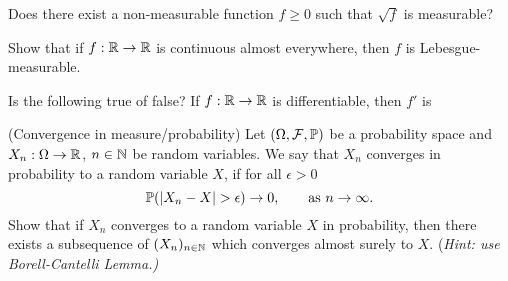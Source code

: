 \begin{problem}
    Does there exist a non-measurable function $f \geq 0$ such that
    $\sqrt{f}$ is measurable?
\end{problem}

\begin{problem}
    Show that if $f:\mathbb R\to \mathbb R$ is continuous almost everywhere, then $f$ is Lebesgue-measurable.
\end{problem}

\begin{problem}
    Is the following true of false?
    If $f : \mathbb R \to \mathbb R$ is differentiable, then $f'$ is 
\end{problem}

\begin{problem}(Convergence in measure/probability) Let $(\Omega,\mathcal F,\mathbb P)$ be a probability space and $X_n:\Omega \to \mathbb R$, $n\in \mathbb N$ be random variables. We say that $X_n$ converges in probability to a random variable $X$, if for all $\epsilon>0$
    \begin{equation*}
        \bbP(|X_n-X|>\epsilon) \to 0,\qquad\text{as $n\to \infty$}.
    \end{equation*}  
Show that if $X_n$ converges to a random variable $X$ in probability, then there exists a subsequence of $(X_n)_{n\in \mathbb N}$ which converges almost surely to $X$. (\emph{Hint: use Borell-Cantelli Lemma.)}
\end{problem}